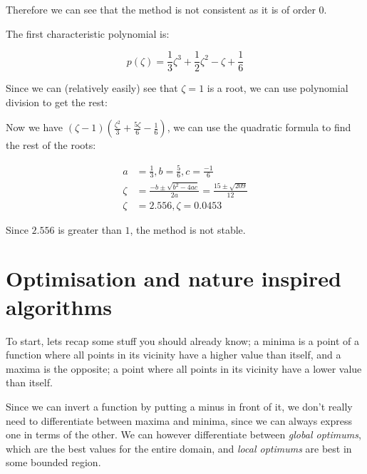 \begin{description}
      Therefore we can see that the method is not consistent as it is
      of order $0$.

      The first characteristic polynomial is:

      \[
        p(\zeta) = \frac{1}{3}\zeta^3 + \frac{1}{2}\zeta^2 - \zeta + \frac{1}{6}
      \]

      Since we can (relatively easily) see that $\zeta = 1$ is a root,
      we can use polynomial division to get the rest:

      \begin{center}
      \end{center}
      
      Now we have $(\zeta - 1)\left(\frac{\zeta^2}{3} + \frac{5\zeta}{6} -
      \frac{1}{6}\right)$, we can use the quadratic formula to find the rest
      of the roots:

      \[
      \begin{split}
        a &= \frac{1}{3}, b = \frac{5}{6}, c = \frac{-1}{6}\\
        \zeta &= \frac{-b \pm\sqrt{b^2 - 4ac}}{2a} = \frac{15 \pm
          \sqrt{209}}{12}\\
        \zeta &= 2.556, \zeta = 0.0453
      \end{split}
      \]

      Since $2.556$ is greater than $1$, the method is not stable.

\end{description}


\section{Optimisation and nature inspired algorithms}

To start, lets recap some stuff you should already know; a minima is a
point of a function where all points in its vicinity have a higher
value than itself, and a maxima is the opposite; a point where all
points in its vicinity have a lower value than itself.

Since we can invert a function by putting a minus in front of it, we
don't really need to differentiate between maxima and minima, since we
can always express one in terms of the other. We can however
differentiate between \textit{global optimums}, which are the best
values for the entire domain, and \textit{local optimums} are best in
some bounded region.


